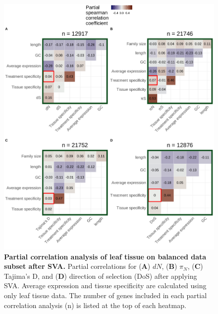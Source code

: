 \documentclass[12pt]{article}
\begin{document}
\begin{figure}[H]
\centering
\includegraphics[width = \linewidth]{figures/appendix_a/partialCorrelations_fullyBalancedSubset_leaf_2023-02-22.pdf}
\caption{\textbf{Partial correlation analysis of leaf tissue on balanced data subset after SVA.} Partial correlations for (\textbf{A}) $dN$, (\textbf{B}) $\pi_N$, (\textbf{C}) Tajima's D, and (\textbf{D}) direction of selection (DoS) after applying SVA. Average expression and tissue specificity are calculated using only leaf tissue data. The number of genes included in each partial correlation analysis (n) is listed at the top of each heatmap.}%
\end{figure}
\end{document}
